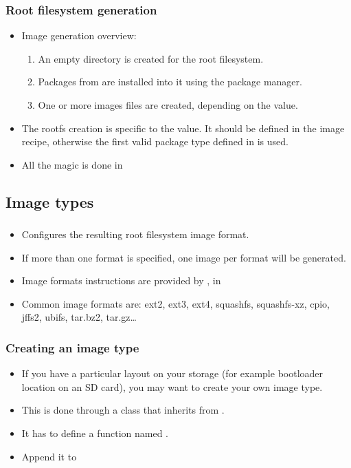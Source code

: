 \begin{frame}
  \frametitle{Root filesystem generation}
  \begin{itemize}
    \item Image generation overview:
      \begin{enumerate}
        \item An empty directory is created for the root filesystem.
        \item Packages from  are installed into it
          using the package manager.
        \item One or more images files are created, depending on the
           value.
      \end{enumerate}
    \item The rootfs creation is specific to the 
      value. It should be defined in the image recipe, otherwise the
      first valid package type defined in  is
      used.
    \item All the magic is done in
  \end{itemize}
\end{frame}

\subsection{Image types}

\begin{frame}
  \frametitle{}
  \begin{itemize}
    \item Configures the resulting root filesystem image format.
    \item If more than one format is specified, one image per format
      will be generated.
    \item Image formats instructions are provided by
      , in
    \item Common image formats are: ext2, ext3, ext4, squashfs,
      squashfs-xz, cpio, jffs2, ubifs, tar.bz2, tar.gz\dots
  \end{itemize}
\end{frame}

\begin{frame}
  \frametitle{Creating an image type}
  \begin{itemize}
    \item If you have a particular layout on your storage (for example
      bootloader location on an SD card), you may want to create your
      own image type.
    \item This is done through a class that inherits from
      .
    \item It has to define a function named .
    \item Append it to 
  \end{itemize}
\end{frame}

